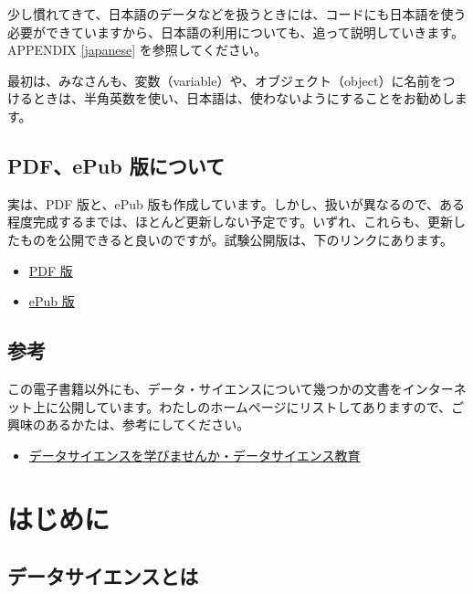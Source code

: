 \documentclass[
  xelatex, ja=standard]{bxjsbook}
\providecommand{\tightlist}{%
  \setlength{\itemsep}{0pt}\setlength{\parskip}{0pt}}
\theoremstyle{definition}
\theoremstyle{definition}
\theoremstyle{definition}
\theoremstyle{definition}
\theoremstyle{remark}
\begin{document}
少し慣れてきて、日本語のデータなどを扱うときには、コードにも日本語を使う必要ができていますから、日本語の利用についても、追って説明していきます。APPENDIX \ref{japanese} を参照してください。

最初は、みなさんも、変数（variable）や、オブジェクト（object）に名前をつけるときは、半角英数を使い、日本語は、使わないようにすることをお勧めします。

\hypertarget{pdfepub-ux7248ux306bux3064ux3044ux3066}{%
\section*{PDF、ePub 版について}\label{pdfepub-ux7248ux306bux3064ux3044ux3066}}

実は、PDF 版と、ePub 版も作成しています。しかし、扱いが異なるので、ある程度完成するまでは、ほとんど更新しない予定です。いずれ、これらも、更新したものを公開できると良いのですが。試験公開版は、下のリンクにあります。

\begin{itemize}
\tightlist
\item
  \href{https://icu-hsuzuki.github.io/ds4aj/ds4aj.pdf}{PDF 版}
\item
  \href{https://icu-hsuzuki.github.io/ds4aj/ds4aj.epub}{ePub 版}
\end{itemize}

\hypertarget{ux53c2ux8003}{%
\section*{参考}\label{ux53c2ux8003}}

この電子書籍以外にも、データ・サイエンスについて幾つかの文書をインターネット上に公開しています。わたしのホームページにリストしてありますので、ご興味のあるかたは、参考にしてください。

\begin{itemize}
\tightlist
\item
  \href{https://icu-hsuzuki.github.io/science/computer/learning/ds.html}{データサイエンスを学びませんか・データサイエンス教育}
\end{itemize}

\hypertarget{introduction}{%
\chapter{はじめに}\label{introduction}}

\hypertarget{ux30c7ux30fcux30bfux30b5ux30a4ux30a8ux30f3ux30b9ux3068ux306f}{%
\section{データサイエンスとは}\label{ux30c7ux30fcux30bfux30b5ux30a4ux30a8ux30f3ux30b9ux3068ux306f}}
\end{document}
